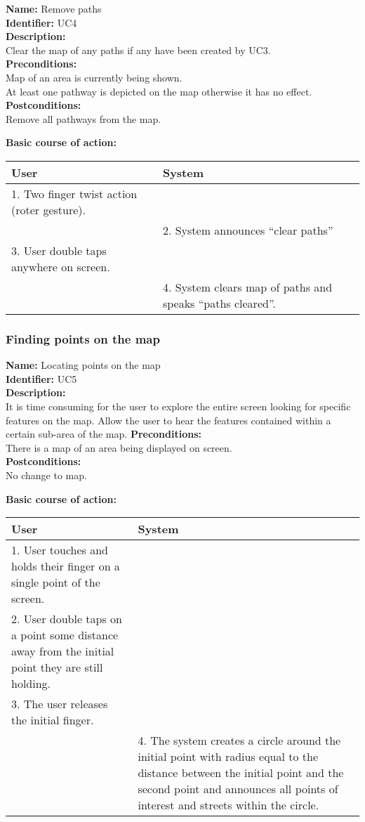 \documentclass[11pt,twoside,a4paper]{article}
\begin{document}
\noindent
\textbf{Name:} Remove paths\\
\textbf{Identifier:} UC4\\
\textbf{Description:}\\
Clear the map of any paths if any have been created by UC3.\\
\textbf{Preconditions:}\\
Map of an area is currently being shown.\\
At least one pathway is depicted on the map otherwise it has no
effect.\\
\textbf{Postconditions:}\\
Remove all pathways from the map.

\noindent
\textbf{Basic course of action:}\\
\begin{tabularx}{\textwidth}{ |X|X| }
  \textbf{User} & \textbf{System}\\
  \hline
  1. Two finger twist action (roter gesture). & \\
  \hline
  & 2. System announces ``clear paths''\\
  \hline
  3. User double taps anywhere on screen. & \\
  \hline
  & 4. System clears map of paths and speaks ``paths cleared''.\\
  \hline
\end{tabularx}

\subsubsection{Finding points on the map}
\noindent
\textbf{Name:} Locating points on the map\\
\textbf{Identifier:} UC5\\
\textbf{Description:}\\
It is time consuming for the user to explore the entire screen looking
for specific features on the map. Allow the user to hear the features
contained within a certain sub-area of the map.
\textbf{Preconditions:}\\
There is a map of an area being displayed on screen.\\
\textbf{Postconditions:}\\
No change to map.

\noindent
\textbf{Basic course of action:}\\
\begin{tabularx}{\textwidth}{ |X|X| }
  \textbf{User} & \textbf{System}\\
  \hline
  1. User touches and holds their finger on a single point of the screen. & \\
  \hline
  2. User double taps on a point some distance away from the initial
  point they are still holding. & \\
  \hline
  3. The user releases the initial finger. & \\
  \hline
  & 4. The system creates a circle around the initial point with
  radius equal to the distance between the initial point and the second
  point and announces all points of interest and streets within the circle.\\
  \hline
\end{tabularx}
\end{document}
